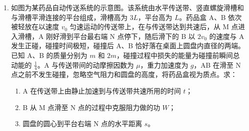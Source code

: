 \documentclass[\gkver]{gaokaozhenti}
\begin{document}
\begin{enumerate}
{$E = 2B_{0}hv + B_{0}hv = 3B_{0}hv$

则感应电流大小为 $I = \frac{E}{R} = \frac{3B_{0}hv}{R}$

所受的安培力为 $F = 2B_{0}\frac{3B_{0}hv}{R}h + B_{0}\frac{3B_{0}hv}{R}h = \frac{9B_{0}^{2}h^{2}v}{R}$

方向水平向左；

（2）在 $\tau$ 时刻，ab 边运动到距区域 Ⅰ 的左边界 $\frac{h}{2}$ 处，线框的速度近似为零，此时线框被固定，则线框面积不变，但 $\tau \sim 2\tau$ 内 Ⅰ 区磁感应强度线性减小，$t = 1.2\tau$ 时 $B_{\text{Ⅰ}} = 2B_{0} - \frac{2B_{0}}{\tau} \times 0.2\tau = 1.6B_{0}$，Ⅱ 区仍为 $B_{0}$（方向与 Ⅰ 区相反），线框在 Ⅰ、Ⅱ 区各有面积 $h \cdot \frac{1}{2}h$，穿过线框的磁通量为

$\Phi = 1.6B_{0}h \cdot \frac{1}{2}h - B_{0}h \cdot \frac{1}{2}h = 0.3B_{0}h^{2}$

方向垂直纸面向里；

（3）$2\tau \sim 3\tau$ 时间内，Ⅱ 区磁感应强度也线性减小到 0，则有

$E' = \frac{\Delta\Phi}{\Delta t} = \frac{B_{0}\frac{1}{2}h^{2}}{\tau} = \frac{B_{0}h^{2}}{2\tau}$

感应电流大小为

$I' = \frac{E'}{R} = \frac{B_{0}h^{2}}{2\tau R}$

则 $2\tau \sim 3\tau$ 时间内，线框中产生的热量为

$Q = I'^{2}Rt = \frac{B_{0}^{2}h^{4}}{4\tau R}$
}

\item
如图为某药品自动传送系统的示意图。该系统由水平传送带、竖直螺旋滑槽和与滑槽平滑连接的平台组成，滑槽高为 $3L$，平台高为 $L$。药品盒 A、B 依次被轻放在以速度 $v_{0}$ 匀速运动的传送带上，在与传送带达到共速后，从 M 点进入滑槽，A 刚好滑到平台最右端 N 点停下，随后滑下的 B 以 $2v_{0}$ 的速度与 A 发生正碰，碰撞时间极短，碰撞后 A、B 恰好落在桌面上圆盘内直径的两端。已知 A、B 的质量分别为 $m$ 和 $2m$，碰撞过程中损失的能量为碰撞前瞬间总动能的 $\frac{1}{4}$。A 与传送带间的动摩擦因数为 $\mu$，重力加速度为 $g$，AB 在滑至 N 点之前不发生碰撞，忽略空气阻力和圆盘的高度，将药品盒视为质点。求：

\begin{enumerate}
	\item
	A 在传送带上由静止加速到与传送带共速所用的时间 $t$；
	\item
	B 从 M 点滑至 N 点的过程中克服阻力做的功 $W$；
	\item
	圆盘的圆心到平台右端 N 点的水平距离 $s$。
\end{enumerate}


\end{enumerate}
\end{document}
